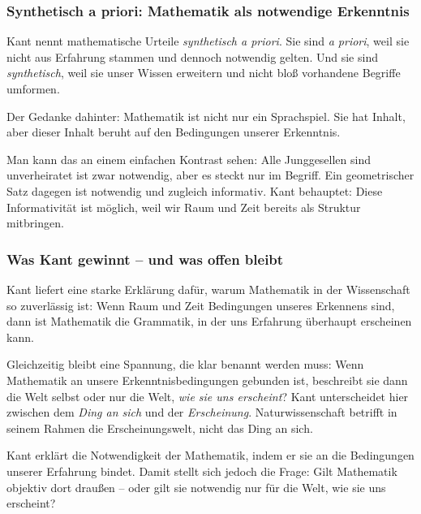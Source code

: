 \subsubsection*{\texorpdfstring{Synthetisch a priori}{Synthetisch a priori}: Mathematik als notwendige Erkenntnis}

Kant nennt mathematische Urteile \emph{synthetisch a priori}.
Sie sind \emph{a priori},
weil sie nicht aus Erfahrung stammen
und dennoch notwendig gelten.
Und sie sind \emph{synthetisch},
weil sie unser Wissen erweitern
und nicht bloß vorhandene Begriffe umformen.

Der Gedanke dahinter:
Mathematik ist nicht nur ein Sprachspiel.
Sie hat Inhalt,
aber dieser Inhalt beruht auf den Bedingungen unserer Erkenntnis.

Man kann das an einem einfachen Kontrast sehen:
\glqq Alle Junggesellen sind unverheiratet\grqq{}
ist zwar notwendig,
aber es steckt nur im Begriff.
Ein geometrischer Satz dagegen ist notwendig
und zugleich informativ.
Kant behauptet:
Diese Informativität ist möglich,
weil wir Raum und Zeit bereits als Struktur mitbringen.

\subsubsection*{Was Kant gewinnt -- und was offen bleibt}

Kant liefert eine starke Erklärung dafür,
warum Mathematik in der Wissenschaft so zuverlässig ist:
Wenn Raum und Zeit Bedingungen unseres Erkennens sind,
dann ist Mathematik die Grammatik,
in der uns Erfahrung überhaupt erscheinen kann.

Gleichzeitig bleibt eine Spannung,
die klar benannt werden muss:
Wenn Mathematik an unsere Erkenntnisbedingungen gebunden ist,
beschreibt sie dann die Welt selbst
oder nur die Welt,
\emph{wie sie uns erscheint}?
Kant unterscheidet hier zwischen dem \emph{Ding an sich}
und der \emph{Erscheinung}.
Naturwissenschaft betrifft in seinem Rahmen die Erscheinungswelt,
nicht das Ding an sich.

\begin{NoteBox}
	\label{box:kant-preis}
	\small
	Kant erklärt die Notwendigkeit der Mathematik,
	indem er sie an die Bedingungen unserer Erfahrung bindet.
	Damit stellt sich jedoch die Frage:
	Gilt Mathematik objektiv dort draußen --
	oder gilt sie notwendig nur für die Welt,
	wie sie uns erscheint?
\end{NoteBox}


